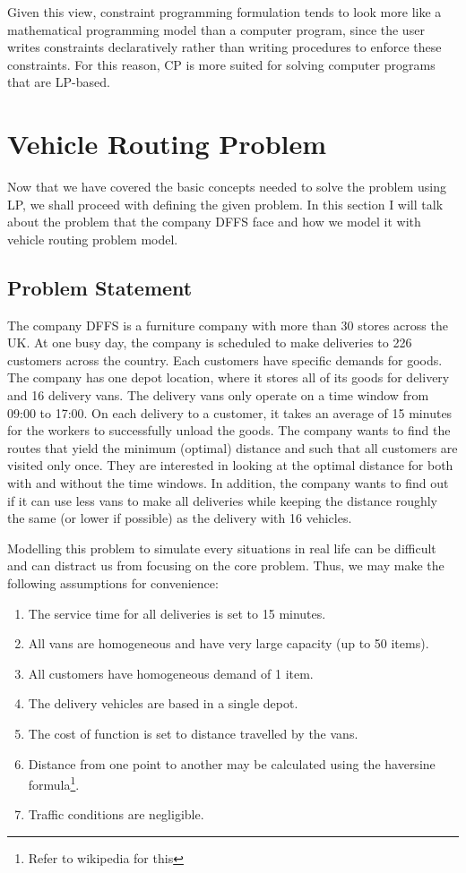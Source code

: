 \documentclass[a4paper, 12pt]{report}
\begin{document}
Given this view, constraint programming formulation tends to look
more like a mathematical programming model than a computer program, since the user writes constraints declaratively
rather than writing procedures to enforce these constraints. For this reason, CP is more suited for solving computer programs that are
LP-based.

\chapter{Vehicle Routing Problem}
Now that we have covered the basic concepts needed to solve the problem using LP, we shall proceed with
defining the given problem. In this section I will talk about the problem that the company DFFS face and how
we model it with vehicle routing problem model.

\section{Problem Statement}
The company DFFS is a furniture company with more than 30 stores across the UK. At one busy day, the company is scheduled to
make deliveries to 226 customers across the country. Each customers have specific demands for goods. The company has
one depot location, where it stores all of its goods for delivery and 16 delivery vans. The delivery vans only operate on
a time window from 09:00 to 17:00. On each delivery to a customer, it takes an average of 15 minutes for the workers to successfully unload the goods.
The company wants to find the routes that yield the minimum (optimal) distance and such that all customers are visited only once. They are interested
in looking at the optimal distance for both with and without the time windows.
In addition, the company wants to find out if it can use less vans to make all deliveries while keeping the distance roughly the same (or lower if possible) as
the delivery with 16 vehicles.

Modelling this problem to simulate every situations in real life can be difficult and can distract us from focusing on the core problem.
Thus, we may make the following assumptions for convenience:
\begin{enumerate}
\item The service time for all deliveries is set to 15 minutes.
\item All vans are homogeneous and have very large capacity (up to 50 items).
\item All customers have homogeneous demand of 1 item.
\item The delivery vehicles are based in a single depot.
\item The cost of function is set to distance travelled by the vans.
\item Distance from one point to another may be calculated using the haversine formula\footnote{Refer to wikipedia for this}.
\item Traffic conditions are negligible.
\end{enumerate}
\end{document}

